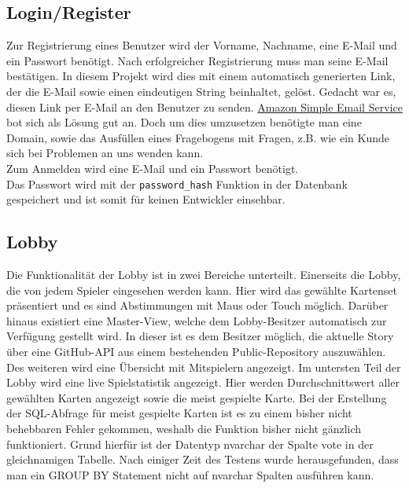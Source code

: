 \subsection{Login/Register}\label{subsec:login/register}
Zur Registrierung eines Benutzer wird der Vorname, Nachname, eine E-Mail und ein Passwort benötigt. Nach erfolgreicher Registrierung muss man seine E-Mail bestätigen. In diesem Projekt wird dies mit einem automatisch generierten Link, der die E-Mail sowie einen eindeutigen String beinhaltet, gelöst. Gedacht war es, diesen Link per E-Mail an den Benutzer zu senden. \href{https://aws.amazon.com/de/ses/}{Amazon Simple Email Service} bot sich als Lösung gut an. Doch um dies umzusetzen benötigte man eine Domain, sowie das Ausfüllen eines Fragebogens mit Fragen, z.B. wie ein Kunde sich bei Problemen an uns wenden kann.\\
Zum Anmelden wird eine E-Mail und ein Passwort benötigt.\\
Das Passwort wird mit der \lstinline{password_hash} Funktion in der Datenbank gespeichert und ist somit für keinen Entwickler einsehbar.

\subsection{Lobby}\label{subsec:lobby}
Die Funktionalität der Lobby ist in zwei Bereiche unterteilt. Einerseits die Lobby, die von jedem Spieler eingesehen werden kann. Hier wird das gewählte Kartenset präsentiert und es sind Abstimmungen mit Maus oder Touch möglich. Darüber hinaus existiert eine Master-View, welche dem Lobby-Besitzer automatisch zur Verfügung gestellt wird. In dieser ist es dem Besitzer möglich, die aktuelle Story über eine GitHub-API aus einem bestehenden Public-Repository auszuwählen. Des weiteren wird eine Übersicht mit Mitspielern angezeigt. Im untersten Teil der Lobby wird eine live Spielstatistik angezeigt. Hier werden Durchschnittswert aller gewählten Karten angezeigt sowie die meist gespielte Karte. Bei der Erstellung der SQL-Abfrage für meist gespielte Karten ist es zu einem bisher nicht behebbaren Fehler gekommen, weshalb die Funktion bisher nicht gänzlich funktioniert. Grund hierfür ist der Datentyp nvarchar der Spalte vote in der gleichnamigen Tabelle. Nach einiger Zeit des Testens wurde herausgefunden, dass man ein GROUP BY Statement nicht auf nvarchar Spalten ausführen kann. 